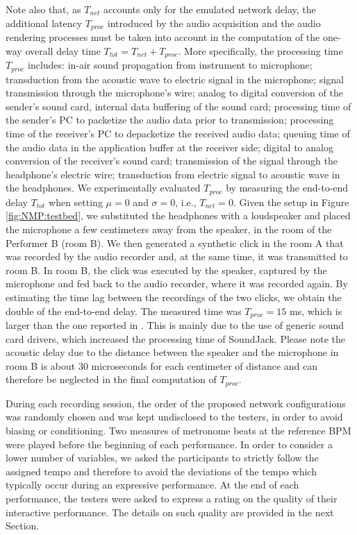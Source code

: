 Note also that, as $T_{net}$ accounts only for the emulated network delay, the additional latency $T_{proc}$ introduced by the audio acquisition and the audio rendering processes must be taken into account in the computation of the one-way overall delay time $T_{tot}=T_{net}+ T_{proc}$.
More specifically, the processing time $T_{proc}$ includes: in-air sound propagation from instrument to microphone; transduction from the acoustic wave to electric signal in the microphone; signal transmission through the microphone's wire; analog to digital conversion of the sender's sound card, internal data buffering of the sound card; processing time of the sender's PC to packetize the audio data prior to transmission; processing time of the receiver's PC to depacketize the received audio data; queuing time of the audio data in the application buffer at the receiver side; digital to analog conversion of the receiver's sound card; transmission of the signal through the headphone's electric wire; transduction from electric signal to acoustic wave in the headphones.
We experimentally evaluated $T_{proc}$ by measuring the end-to-end delay $T_{tot}$ when setting $\mu=0$ and $\sigma=0$, i.e., $T_{net}=0$. Given the setup in Figure \ref{fig:NMP:testbed}, we substituted the headphones with a loudspeaker and placed the microphone a few centimeters away from the speaker, in the room of the Performer B (room B). We then generated a synthetic click in the room A that was recorded by the audio recorder and, at the same time, it was transmitted to room B. In room B, the click was executed by the speaker, captured by the microphone and fed back to the audio recorder, where it was recorded again. By estimating the time lag between the recordings of the two clicks, we obtain the double of the end-to-end delay. The measured time was $T_{proc}=15$ ms, which is larger than the one reported in \cite{carot2007networked}. This is mainly due to the use of generic sound card drivers, which increased the processing time of SoundJack. Please note the acoustic delay due to the distance between the speaker and the microphone in room B is about 30 microseconds for each centimeter of distance and can therefore be neglected in the final computation of $T_{proc}$.

During each recording session, the order of the proposed network configurations was randomly chosen and was kept undisclosed to the testers, in order to avoid biasing or conditioning. Two measures of metronome beats at the reference BPM were played before the beginning of each performance. In order to consider a lower number of variables, we asked the participants to strictly follow the assigned tempo and therefore to avoid the deviations of the tempo which typically occur during an expressive performance. At the end of each performance, the testers were asked to express a rating on the quality of their interactive performance. The details on such quality are provided in the next Section.

